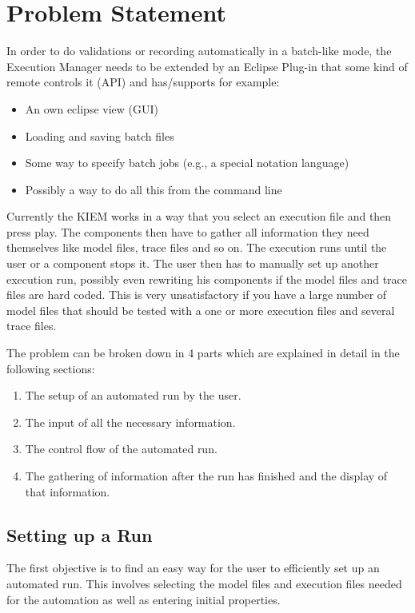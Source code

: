 \chapter{Problem Statement}
\label{chapter:AutoTask}

In order to do validations or recording automatically in a batch-like mode, 
the Execution Manager needs to be extended by an Eclipse Plug-in that some kind of 
remote controls it (API) and has/supports for example: 
\begin{itemize}
 \item An own eclipse view (GUI) 
 \item Loading and saving batch files 
 \item Some way to specify batch jobs (e.g., a special notation language) 
 \item Possibly a way to do all this from the command line
\end{itemize}


Currently the KIEM works in a way that you select an execution file and then
press play. The components then have to gather all information they need
themselves like model files, trace files and so on. The execution runs until
the user or a component stops it. The user then has to manually set up another
execution run, possibly even rewriting his components if the model files
and trace files are hard coded.
This is very unsatisfactory if you have a large number of model files that
should be tested with a one or more execution files and several trace files.

The problem can be broken down in 4 parts which are explained in detail in
the following sections:
\begin{enumerate}
 \item The setup of an automated run by the user.
 \item The input of all the necessary information.
 \item The control flow of the automated run.
 \item The gathering of information after the run has finished and the display 
of that information.
\end{enumerate}


\section{Setting up a Run}
\label{section:AutoTaskSetup}
The first objective is to find an easy way for the user to efficiently set up an
automated run. This involves selecting the model files and execution files
needed for the automation as well as entering initial properties.


